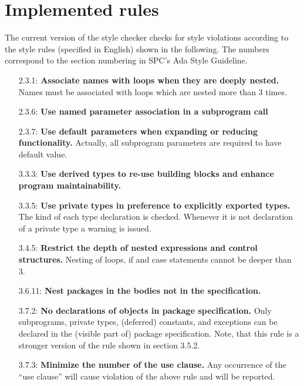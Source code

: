 \section{Implemented rules}

The current version of the style checker checks for style violations
according to the style rules (specified in English) shown in the following.
The numbers correspond to the section numbering in SPC's Ada Style Guideline.


\begin{itemize}
\item [2.3.1:] {\bf Associate names with loops when they are deeply nested.}
Names must be associated with loops which are nested more than 3 times.

\item [2.3.6:] {\bf Use named parameter association in a subprogram call}

\item [2.3.7:] {\bf Use default parameters when expanding or reducing functionality.} 
Actually, all subprogram parameters are required to have default value.

\item [3.3.3:] {\bf Use derived types to re-use building blocks and enhance program maintainability.}

\item [3.3.5:] {\bf Use private types in preference to explicitly exported types.}
The kind of each type declaration is checked. Whenever it is not declaration of a private type a warning is issued.

\item [3.4.5:] {\bf Restrict the depth of nested expressions and control structures.}
Nesting of loops, if and case statements cannot be deeper than 3.

\item [3.6.11:] {\bf Nest packages in the bodies not in the specification.}

\item [3.7.2:] {\bf No declarations of objects in package specification.}
Only subprograms, private types, (deferred) constants, and exceptions can be declared in the (visible part of) package specification. Note, that this
rule is a stronger version of the rule shown in section 3.5.2.

\item [3.7.3:] {\bf Minimize the number of the use clause.}
Any occurrence of the ``use clause'' will cause violation of the above rule  and will be reported.


\end{itemize}
